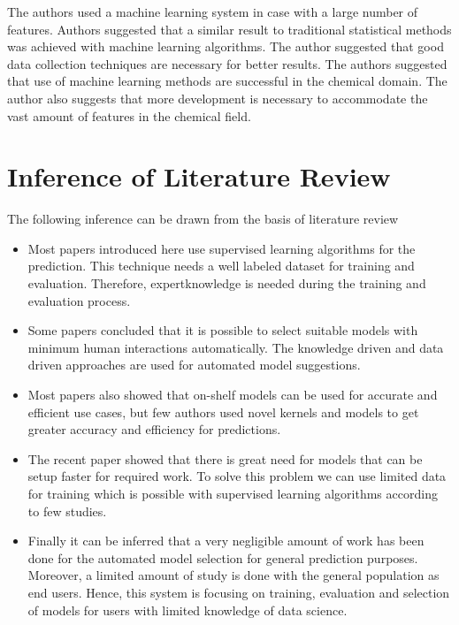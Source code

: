 The authors used a machine learning system in case with a large number of features. Authors suggested that a similar result to traditional statistical methods was achieved with machine learning algorithms. The author suggested that good data collection techniques are necessary for better results. The authors suggested that use of machine learning methods are successful in the chemical domain. The author also suggests that more development is necessary to accommodate the vast amount of features in the chemical field.

\section{Inference of Literature Review} \label{sec:inference _of_literature_review}

The following inference can be drawn from the basis of literature review

\vspace{-1.5em}

\begin{itemize}
  \item Most papers introduced here use supervised learning algorithms for the prediction. This technique needs a well labeled dataset for training and evaluation. Therefore, expertknowledge is needed during the training and evaluation process.
  \item Some papers concluded that it is possible to select suitable models with minimum human interactions automatically. The knowledge driven and data driven approaches are used for automated model suggestions.
  \item Most papers also showed that on-shelf models can be used for accurate and efficient use cases, but few authors used novel kernels and models to get greater accuracy and efficiency for predictions.
  \item The recent paper showed that there is great need for models that can be setup faster for required work. To solve this problem we can use limited data for training which is possible with supervised learning algorithms according to few studies.
  \item Finally it can be inferred that a very negligible amount of work has been done for the automated model selection for general prediction purposes. Moreover, a limited amount of study is done with the general population as end users. Hence, this system is focusing on training, evaluation and selection of models for users with limited knowledge of data science.
\end{itemize}
